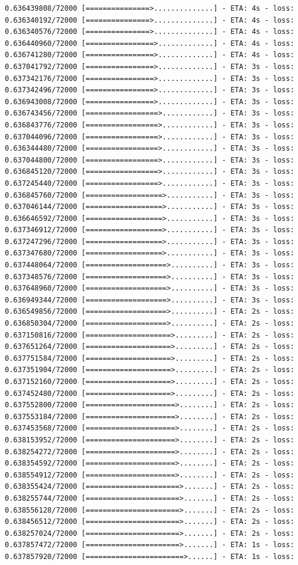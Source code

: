 \documentclass[12pt,fleqn]{article}\usepackage{../../common}
\begin{document}
\begin{verbatim}
0.636439808/72000 [===============>..............] - ETA: 4s - loss: 0.636340192/72000 [===============>..............] - ETA: 4s - loss: 0.636340576/72000 [===============>..............] - ETA: 4s - loss: 0.636440960/72000 [================>.............] - ETA: 4s - loss: 0.636741280/72000 [================>.............] - ETA: 4s - loss: 0.637041792/72000 [================>.............] - ETA: 3s - loss: 0.637342176/72000 [================>.............] - ETA: 3s - loss: 0.637342496/72000 [================>.............] - ETA: 3s - loss: 0.636943008/72000 [================>.............] - ETA: 3s - loss: 0.636743456/72000 [=================>............] - ETA: 3s - loss: 0.636843776/72000 [=================>............] - ETA: 3s - loss: 0.637044096/72000 [=================>............] - ETA: 3s - loss: 0.636344480/72000 [=================>............] - ETA: 3s - loss: 0.637044800/72000 [=================>............] - ETA: 3s - loss: 0.636845120/72000 [=================>............] - ETA: 3s - loss: 0.637245440/72000 [=================>............] - ETA: 3s - loss: 0.636845760/72000 [==================>...........] - ETA: 3s - loss: 0.637046144/72000 [==================>...........] - ETA: 3s - loss: 0.636646592/72000 [==================>...........] - ETA: 3s - loss: 0.637346912/72000 [==================>...........] - ETA: 3s - loss: 0.637247296/72000 [==================>...........] - ETA: 3s - loss: 0.637347680/72000 [==================>...........] - ETA: 3s - loss: 0.637448064/72000 [===================>..........] - ETA: 3s - loss: 0.637348576/72000 [===================>..........] - ETA: 3s - loss: 0.637648960/72000 [===================>..........] - ETA: 3s - loss: 0.636949344/72000 [===================>..........] - ETA: 3s - loss: 0.636549856/72000 [===================>..........] - ETA: 2s - loss: 0.636850304/72000 [===================>..........] - ETA: 2s - loss: 0.637150816/72000 [====================>.........] - ETA: 2s - loss: 0.637651264/72000 [====================>.........] - ETA: 2s - loss: 0.637751584/72000 [====================>.........] - ETA: 2s - loss: 0.637351904/72000 [====================>.........] - ETA: 2s - loss: 0.637152160/72000 [====================>.........] - ETA: 2s - loss: 0.637452480/72000 [====================>.........] - ETA: 2s - loss: 0.637552800/72000 [=====================>........] - ETA: 2s - loss: 0.637553184/72000 [=====================>........] - ETA: 2s - loss: 0.637453568/72000 [=====================>........] - ETA: 2s - loss: 0.638153952/72000 [=====================>........] - ETA: 2s - loss: 0.638254272/72000 [=====================>........] - ETA: 2s - loss: 0.638354592/72000 [=====================>........] - ETA: 2s - loss: 0.638554912/72000 [=====================>........] - ETA: 2s - loss: 0.638355424/72000 [======================>.......] - ETA: 2s - loss: 0.638255744/72000 [======================>.......] - ETA: 2s - loss: 0.638556128/72000 [======================>.......] - ETA: 2s - loss: 0.638456512/72000 [======================>.......] - ETA: 2s - loss: 0.638257024/72000 [======================>.......] - ETA: 2s - loss: 0.637857472/72000 [======================>.......] - ETA: 1s - loss: 0.637857920/72000 [=======================>......] - ETA: 1s - loss: 
\end{verbatim}
\end{document}
